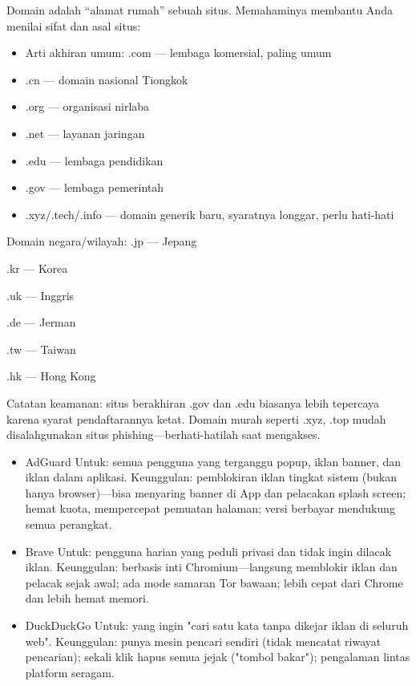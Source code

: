 
Domain adalah “alamat rumah” sebuah situs. Memahaminya membantu Anda menilai sifat dan asal situs:

\begin{itemize}
  \item Arti akhiran umum: .com — lembaga komersial, paling umum
  \item .cn — domain nasional Tiongkok
  \item .org — organisasi nirlaba
  \item .net — layanan jaringan
  \item .edu — lembaga pendidikan
  \item .gov — lembaga pemerintah
  \item .xyz/.tech/.info — domain generik baru, syaratnya longgar, perlu hati-hati
\end{itemize}

Domain negara/wilayah: .jp — Jepang

.kr — Korea

.uk — Inggris

.de — Jerman

.tw — Taiwan

.hk — Hong Kong

Catatan keamanan: situs berakhiran .gov dan .edu biasanya lebih tepercaya karena syarat pendaftarannya ketat. Domain murah seperti .xyz, .top mudah disalahgunakan situs phishing—berhati-hatilah saat mengakses.


\begin{itemize}
  \item AdGuard Untuk: semua pengguna yang terganggu popup, iklan banner, dan iklan dalam aplikasi. Keunggulan: pemblokiran iklan tingkat sistem (bukan hanya browser)—bisa menyaring banner di App dan pelacakan splash screen; hemat kuota, mempercepat pemuatan halaman; versi berbayar mendukung semua perangkat.
\end{itemize}


\begin{itemize}
  \item Brave Untuk: pengguna harian yang peduli privasi dan tidak ingin dilacak iklan. Keunggulan: berbasis inti Chromium—langsung memblokir iklan dan pelacak sejak awal; ada mode samaran Tor bawaan; lebih cepat dari Chrome dan lebih hemat memori.
  \item DuckDuckGo Untuk: yang ingin "cari satu kata tanpa dikejar iklan di seluruh web". Keunggulan: punya mesin pencari sendiri (tidak mencatat riwayat pencarian); sekali klik hapus semua jejak ("tombol bakar"); pengalaman lintas platform seragam.
\end{itemize}


